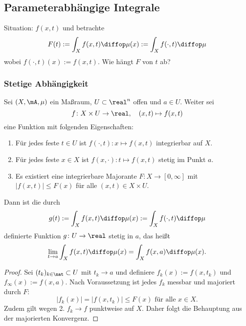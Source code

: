 \subsection{Parameterabhängige Integrale}
Situation: $f(x,t)$ und betrachte
\[ F(t):= \int_X f(x,t) \diffop \mu(x) := \int_X f( \cdot, t ) \diffop \mu \]
wobei $f( \cdot, t)(x) := f(x,t)$. Wie hängt $F$ von $t$ ab?

\subsubsection{Stetige Abhängigkeit}
\begin{thm}
 Sei $(X, \mA, \mu)$ ein Maßraum, $U \subset \real^n$ offen und $a \in U$. Weiter sei
 \[ f\colon X \times U \to \real, \quad (x,t) \mapsto f(x,t) \]
 eine Funktion mit folgenden Eigenschaften:
 \begin{enumerate}
  \item Für jedes feste $t \in U$ ist $f( \cdot, t ): x \mapsto f(x,t)$ integrierbar auf $X$.
  \item Für jedes feste $x \in X$ ist $f( x, \cdot ): t \mapsto f(x,t)$ stetig im Punkt $a$.
  \item Es existiert eine integrierbare Majorante $F\colon X \to [0,\infty]$ mit $|f(x,t)| \le F(x)$ für alle $(x,t) \in X \times U$.
 \end{enumerate}
 Dann ist die durch
 \[ g(t) := \int_X f(x,t) \diffop \mu(x) := \int_X f( \cdot, t ) \diffop \mu \]
 definierte Funktion $g\colon U \to \real$ stetig in $a$, das heißt
 \[ \lim_{t \to a} \int_X f(x,t) \diffop \mu(x) = \int_X f(x,a) \diffop \mu(x). \]
\end{thm}

\begin{proof}
 Sei $(t_k)_{k \in \nat} \subset U$ mit $t_k \to a$ und definiere $f_k(x) := f(x, t_k)$ und $f_\infty(x) := f(x, a)$. Nach Voraussetzung ist jedes $f_k$ messbar und majoriert durch $F$:
 \[ |f_k(x)| = |f(x,t_k)| \le F(x) \text{ für alle } x \in X. \]
 Zudem gilt wegen 2. $f_k \to f$ punktweise auf $X$. Daher folgt die Behauptung aus der majorierten Konvergenz.
\end{proof}

